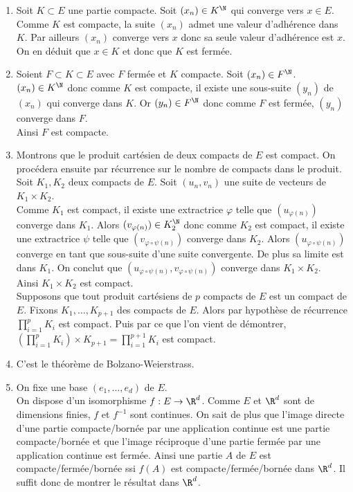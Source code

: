 \documentclass{book}
\begin{document}
	\begin{enumerate}[leftmargin=*]
		\item Soit $K\subset E$ une partie compacte. Soit $(x_n)\in K^\N$ qui converge vers $x\in E$.\\
		Comme $K$ est compacte, la suite $(x_n)$ admet une valeur d'adhérence dans $K$. Par ailleurs $(x_n)$ converge vers $x$ donc sa seule valeur d'adhérence est $x$. On en déduit que $x\in K$ et donc que $K$ est fermée.
		\item Soient $F\subset K\subset E$ avec $F$ fermée et $K$ compacte. Soit $(x_n)\in F^\N$.\\
		$(x_n)\in K^\N$ donc comme $K$ est compacte, il existe une sous-suite $(y_n)$ de $(x_n)$ qui converge dans $K$. Or $(y_n)\in F^\N$ donc comme $F$ est fermée, $(y_n)$ converge dans $F$.\\
		Ainsi $F$ est compacte.
		\item Montrons que le produit cartésien de deux compacts de $E$ est compact. On procédera ensuite par récurrence sur le nombre de compacts dans le produit.\\
		Soit $K_1,K_2$ deux compacts de $E$. Soit $(u_n,v_n)$ une suite de vecteurs de $K_1\times K_2$.\\
		Comme $K_1$ est compact, il existe une extractrice $\varphi$ telle que $(u_{\varphi(n)})$ converge dans $K_1$. Alors $(v_{\varphi(n)})\in K_2^\N$ donc comme $K_2$ est compact, il existe une extractrice $\psi$ telle que $(v_{\varphi\circ\psi(n)})$ converge dans $K_2$. Alors $(u_{\varphi\circ\psi(n)})$ converge en tant que sous-suite d'une suite convergente. De plus sa limite est dans $K_1$. On conclut que $(u_{\varphi\circ\psi(n)},v_{\varphi\circ\psi(n)})$ converge dans $K_1\times K_2$.\\
		Ainsi $K_1\times K_2$ est compact.\\
		Supposons que tout produit cartésiens de $p$ compacts de $E$ est un compact de $E$. Fixons $K_1,\dots,K_{p+1}$ des compacts de $E$. Alors par hypothèse de récurrence $\displaystyle\prod_{i=1}^pK_i$ est compact. Puis par ce que l'on vient de démontrer, $\displaystyle\left(\prod_{i=1}^pK_i\right)\times K_{p+1}=\prod_{i=1}^{p+1}K_i$ est compact.
		\item C'est le théorème de Bolzano-Weierstrass.
		\item On fixe une base $(e_1,\dots,e_d)$ de $E$.\\
		On dispose d'un isomorphisme $f:E\to \R^d$. Comme $E$ et $\R^d$ sont de dimensions finies, $f$ et $f^{-1}$ sont continues. On sait de plus que l'image directe d'une partie compacte/bornée par une application continue est une partie compacte/bornée et que l'image réciproque d'une partie fermée par une application continue est fermée. Ainsi une partie $A$ de $E$ est compacte/fermée/bornée ssi $f(A)$ est compacte/fermée/bornée dans $\R^d$. Il suffit donc de montrer le résultat dans $\R^d$.\\

\end{enumerate}
\end{document}
